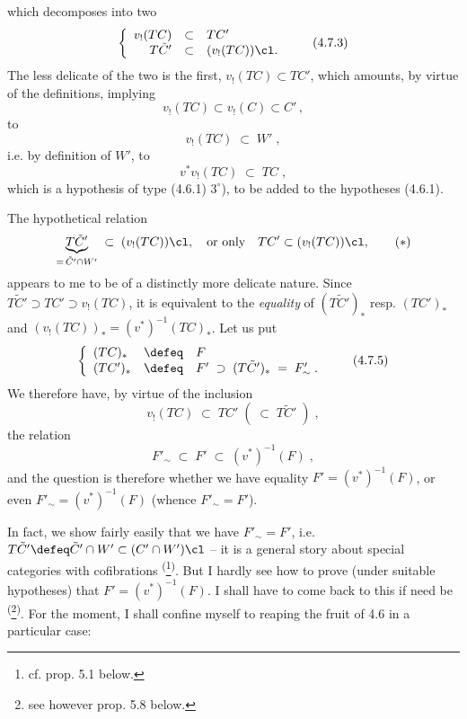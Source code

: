 which decomposes into two
\[
\left\{
\begin{array}{rcl}
v_{!}(TC) & \subset & TC' \\
T\tilde{C}' & \subset & (v_{!}(TC))\cl.
\end{array}
\right.
\tag*{(4.7.3)}
\]
The less delicate of the two is the  first, $v_{!}(TC) \subset TC'$, which amounts, by virtue of the definitions, implying
\[
v_{!}(TC) \subset v_{!}(C) \subset C' \, ,
\]
to
\[
v_{!}(TC) \;\subset\; W' \; ,
\]
i.e. by definition of $W'$, to
\[
v^{*}v_{!}(TC) \;\subset\; TC \; ,
\tag*{(4.7.4)}
\]
which is a hypothesis of type (4.6.1) $3^{\circ}$), to be added to the hypotheses (4.6.1).

The hypothetical relation
\[
\underbrace{T\tilde{C}'}_{=\,\tilde{C}'\cap W'} \;\subset\; (v_{!}(TC))\cl, \quad \text{or only} \quad TC' \subset (v_{!}(TC))\cl,
\tag*{$(*)$}
\]
appears to me to be of a distinctly more delicate nature. Since $T\tilde{C}' \supset TC' \supset v_{!}(TC)$, it is equivalent to the \textit{equality} of $(T\tilde{C}')_{*}$ resp. $(TC')_{*}$ and $(v_{!}(TC))_{*} = (v^{*})^{-1}(TC)_{*}$. Let us put
\[
\left\{
\begin{array}{lcl}
(TC)_{*} & \defeq & F \\
(TC')_{*} & \defeq & F' \;\supset\; (T\tilde{C}')_{*} \;=\; F'_{\sim} \; .
\end{array}
\right.
\tag*{(4.7.5)}
\]
We therefore have, by virtue of the inclusion
\[
v_{!}(TC) \;\subset\; TC' \; ( \;\subset\; T\tilde{C}' \; ) \; ,
\]
the relation
\[
F'_{\sim} \;\subset\; F' \;\subset\; (v^{*})^{-1}(F) \; ,
\tag*{(4.7.6)}
\]
and the question is therefore whether we have equality $F' = (v^{*})^{-1}(F)$, or even $F'_{\sim} = (v^{*})^{-1}(F)$ (whence $F'_{\sim} = F'$).


In fact, we show fairly easily that we have $F'_{\sim} = F'$, i.e. $T\tilde{C}' \defeq \tilde{C}' \cap W' \subset (C' \cap W')\cl$ -- it is a general story about special categories with cofibrations \textsuperscript{(}\footnote[21]{cf. prop. 5.1 below.}\textsuperscript{)}. But I hardly see how to prove (under suitable hypotheses) that $F' = (v^{*})^{-1}(F)$. I shall have to come back to this if need be \textsuperscript{(}\footnote[22]{see however prop. 5.8 below.}\textsuperscript{)}. For the moment, I shall confine myself to reaping the fruit of 4.6 in a particular case:

